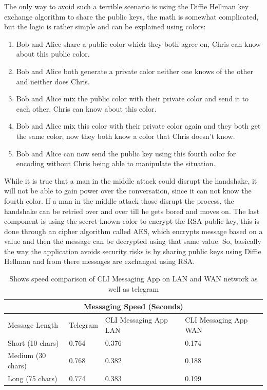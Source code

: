 \documentclass[twoside]{article}
\begin{document}
\begin{multicols}{2}
The only way to avoid such a terrible scenario is using the Diffie Hellman key exchange algorithm to share the public keys, the math is somewhat complicated, but the logic is rather simple and can be explained using colors:

\begin{enumerate}
  \item Bob and Alice share a public color which they both agree on, Chris can know about this public color.
  \item Bob and Alice both generate a private color neither one knows of the other and neither does Chris.
  \item Bob and Alice mix the public color with their private color and send it to each other, Chris can know about this color.
  \item Bob and Alice mix this color with their private color again and they both get the same color, now they both know a color that Chris doesn't know.
  \item Bob and Alice can now send the public key using this fourth color for encoding without Chris being able to manipulate the situation.
\end{enumerate}

While it is true that a man in the middle attack could disrupt the handshake, it will not be able to gain power over the conversation, since it can not know the fourth color. If a man in the middle attack those disrupt the process, the handshake can be retried over and over till he gets bored and moves on. The last component is using the secret known color to encrypt the RSA public key, this is done through an cipher algorithm called AES, which encrypts message based on a value and then the message can be decrypted using that same value. So, basically the way the application avoids security risks is by sharing public keys using Diffie Hellman and from there messages are exchanged using RSA.

\begin{table}[t]
\centering
\begin{tabular}{ |p{3cm}||p{3cm}|p{3cm}|p{3cm}|  }
 \hline
 \multicolumn{4}{|c|}{Messaging Speed (Seconds)} \\
 \hline
Message Length& Telegram &CLI Messaging App LAN &CLI Messaging App WAN \\
 \hline
 Short (10 chars)   &0.764&0.376& 0.174\\
 Medium (30 chars)&0.768  &0.382& 0.188\\
 Long (75 chars) &0.774 & 0.383&0.199 \\
 \hline
\end{tabular}
\caption{ Shows speed comparison of CLI Messaging App on LAN and WAN network as well as telegram}
\end{table}


\end{multicols}
\end{document}

